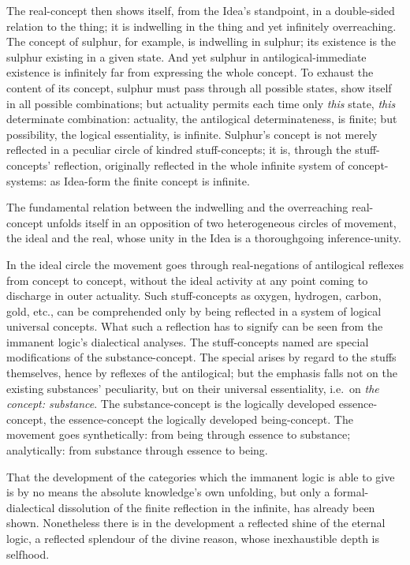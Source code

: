 \documentclass[12pt]{book}
\begin{document}
The real-concept then shows itself, from the Idea's standpoint, in a
double-sided relation to the thing; it is indwelling in the thing
and yet infinitely overreaching. The concept of sulphur, for
example, is indwelling in sulphur; its existence is the sulphur
existing in a given state. And yet sulphur in antilogical-immediate
existence is infinitely far from expressing the whole concept. To
exhaust the content of its concept, sulphur must pass through all
possible states, show itself in all possible combinations; but
actuality permits each time only \emph{this} state, \emph{this}
determinate combination: actuality, the antilogical determinateness,
is finite; but possibility, the logical essentiality, is infinite.
Sulphur's concept is not merely reflected in a peculiar circle of
kindred stuff-concepts; it is, through the stuff-concepts'
reflection, originally reflected in the whole infinite system of
concept-systems: as Idea-form the finite concept is infinite.

The fundamental relation between the indwelling and the overreaching
real-concept unfolds itself in an opposition of two heterogeneous
circles of movement, the ideal and the real, whose unity in the Idea
is a thoroughgoing inference-unity.

In the ideal circle the movement goes through real-negations of
antilogical reflexes from concept to concept, without the ideal
activity at any point coming to discharge in outer actuality. Such
stuff-concepts as oxygen, hydrogen, carbon, gold, etc., can be
comprehended only by being reflected in a system of logical
universal concepts. What such a reflection has to signify can be
seen from the immanent logic's dialectical analyses. The
stuff-concepts named are special modifications of the
substance-concept. The special arises by regard to the stuffs
themselves, hence by reflexes of the antilogical; but the emphasis
falls not on the existing substances' peculiarity, but on their
universal essentiality, i.e.\ on \emph{the concept: substance}. The
substance-concept is the logically developed essence-concept, the
essence-concept the logically developed being-concept. The movement
goes synthetically: from being through essence to substance;
analytically: from substance through essence to being.

That the development of the categories which the immanent logic is
able to give is by no means the absolute knowledge's own unfolding,
but only a formal-dialectical dissolution of the finite reflection
in the infinite, has already been shown. Nonetheless there is in the
development a reflected shine of the eternal logic, a reflected
splendour of the divine reason, whose inexhaustible depth is
selfhood.
\end{document}
